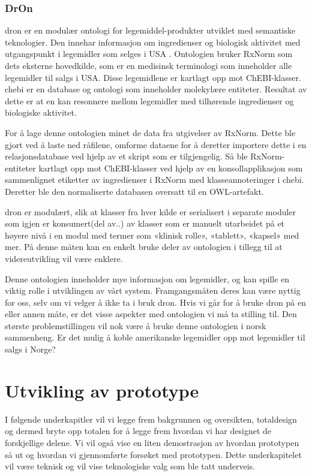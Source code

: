 \subsubsection{DrOn}
\gls{dron} er en modulær ontologi for legemiddel-produkter utviklet med semantiske teknologier. Den innehar informasjon om ingredienser og biologisk aktivitet med utgangspunkt i legemidler som selges i USA \citep{dron_2013}. Ontologien bruker RxNorm som dets eksterne hovedkilde, som er en medisinsk terminologi som inneholder alle legemidler til salgs i USA. Disse legemidlene er kartlagt opp mot ChEBI-klasser. \gls{chebi} er en database og ontologi som inneholder molekylære entiteter. Resultat av dette er at en kan resonnere mellom legemidler med tilhørende ingredienser og biologiske aktivitet. 

For å lage denne ontologien minet de data fra utgivelser av RxNorm. Dette ble gjort ved å laste ned råfilene, omforme dataene for å deretter importere dette i en relasjonsdatabase ved hjelp av et skript som er tilgjengelig. Så ble RxNorm-entiteter kartlagt opp mot ChEBI-klasser ved hjelp av en konsollapplikasjon som sammenlignet etiketter av ingredienser i RxNorm med klasseannoteringer i \gls{chebi}. Deretter ble den normaliserte databasen oversatt til en OWL-artefakt. 

\gls{dron} er modulært, slik at klasser fra hver kilde er serialisert i separate moduler som igjen er konsumert(del av..) av klasser som er manuelt utarbeidet på et høyere nivå i en modul med termer som «klinisk rolle», «tablett», «kapsel» med mer. På denne måten kan en enkelt bruke deler av ontologien i tillegg til at videreutvikling vil være enklere. 

Denne ontologien inneholder mye informasjon om legemidler, og kan spille en viktig rolle i utviklingen av vårt system. Framgangsmåten deres kan være nyttig for oss, selv om vi velger å ikke ta i bruk \gls{dron}. Hvis vi går for å bruke \gls{dron} på en eller annen måte, er det visse aspekter med ontologien vi må ta stilling til. Den største problemstillingen vil nok være å bruke denne ontologien i norsk sammenheng. Er det mulig å koble amerikanske legemidler opp mot legemidler til salgs i Norge? 
\section{Utvikling av prototype}
I følgende underkapitler vil vi legge frem bakgrunnen og oversikten, totaldesign og dermed bryte opp totalen for å legge frem hvordan vi har designet de forskjellige delene. Vi vil også vise en liten demostrasjon av hvordan prototypen så ut og hvordan vi gjennomførte forsøket med prototypen. Dette underkapitelet vil være teknisk og vil vise teknologiske valg som ble tatt underveis.
\label{chap:gjenomf_utviklingavprototype}
